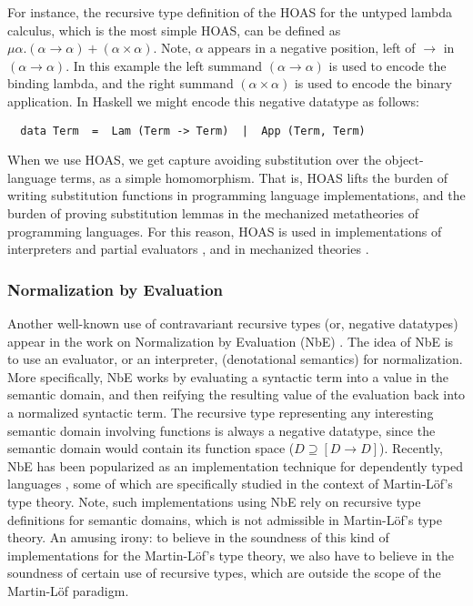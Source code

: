For instance, the recursive type definition of the HOAS for
the untyped lambda calculus, which is the most simple HOAS, can be defined as
$\mu\alpha.(\alpha\to\alpha)+(\alpha\times\alpha)$. Note, $\alpha$ appears
in a negative position, left of $\to$ in $(\alpha\to\alpha)$. In this example
the left summand $(\alpha\to\alpha)$ is used to encode the binding lambda, and
the right summand $(\alpha\times\alpha)$ is used to encode
the binary application. In Haskell we might encode this negative datatype
as follows:
\begin{verbatim}
  data Term  =  Lam (Term -> Term)  |  App (Term, Term)
\end{verbatim}

When we use HOAS, we get capture avoiding substitution over
the object-language terms, as a simple homomorphism. That is, HOAS lifts the burden of writing
substitution functions in programming language implementations, and
the burden of proving substitution lemmas in the mechanized metatheories of
programming languages. For this reason, HOAS is used in implementations of
interpreters and partial evaluators \cite{SumKob99,DanRhi00,CarKisSha09},
and in mechanized theories \cite{Des95,HonMicSca01,Abe08,Chl08}.

\subsubsection{Normalization by Evaluation}\label{sssec:NbE}
Another well-known use of contravariant recursive types (or, negative datatypes)
appear in the work on Normalization by Evaluation (NbE) \cite{BerSch91}.
The idea of NbE is to use an evaluator, or an interpreter,
(\ie denotational semantics) for normalization. More specifically,
NbE works by evaluating a syntactic term into a value in the semantic domain,
and then reifying the resulting value of the evaluation back into
a normalized syntactic term. The recursive type representing
any interesting semantic domain involving functions is always
a negative datatype, since the semantic domain would contain its function space
(\ie $D \supseteq [D\to D]$). Recently, NbE has been popularized as
an implementation technique for dependently typed languages
\cite{LohMcbSwi07,AbeAehDyb07,AbeCoqDyb07}, some of which are
specifically studied in the context of Martin-L\"of's type theory.
Note, such implementations using NbE rely on recursive type definitions
for semantic domains, which is not admissible in Martin-L\"of's type theory. 
An amusing irony: to believe in the soundness of this kind of implementations
for the Martin-L\"of's type theory, we also have to believe in the soundness of
certain use of recursive types, which are outside the scope of
the Martin-L\"of paradigm.




